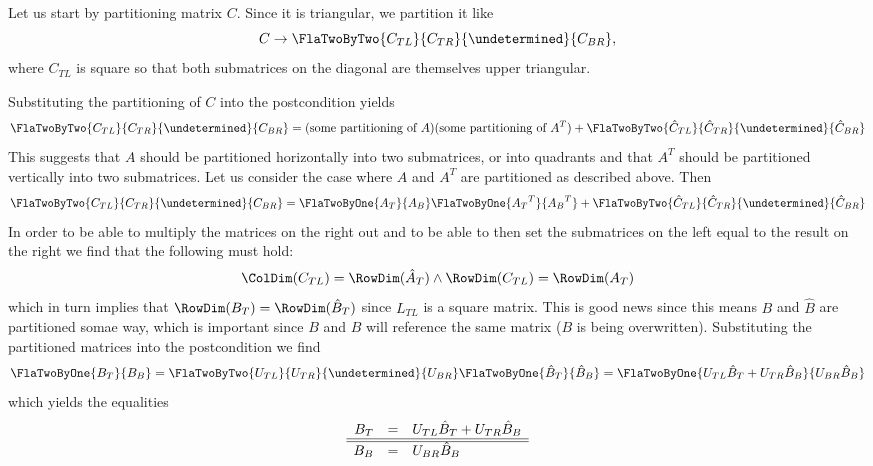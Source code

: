 Let us start by partitioning matrix $ C $.  Since it is triangular, we
partition it like
\[
C \rightarrow \FlaTwoByTwo{ C_{TL} }        { C_{TR} }
                          { \undetermined } { C_{BR} },
\]
where $ C_{TL} $ is square so that both submatrices on the diagonal
are themselves upper triangular.

Substituting the partitioning of $ C $ into the postcondition yields
\[
\FlaTwoByTwo{ C_{TL} }        { C_{TR} }
            { \undetermined } { C_{BR} }
= 
( \mbox{some partitioning of }{A} )
( \mbox{some partitioning of }{A^T} )
+
\FlaTwoByTwo{ \hat{C}_{TL} }  { \hat{C}_{TR} }
            { \undetermined } { \hat{C}_{BR} }
\]
This suggests that $ A $ should be partitioned
horizontally  into two submatrices, or into quadrants and that $ A^T $ should be partitioned vertically into two submatrices.  Let us consider
the case where $ A $ and $ A^T $ are partitioned as described above.  Then
\[
\FlaTwoByTwo{ C_{TL} }        { C_{TR} }
            { \undetermined } { C_{BR} }
= 
\FlaTwoByOne{ A_T }
            { A_B }

\FlaTwoByOne{ {A_T}^T }
            { {A_B}^T }
+
\FlaTwoByTwo{ \hat{C}_{TL} }   { \hat{C}_{TR} }
            { \undetermined }  { \hat{C}_{BR} }
\]
In order to be able to multiply the matrices on the right out and to
be able to then set the submatrices on the left equal to the result on
the right we find that the following must hold:
\[
\ColDim( C_{TL} ) = \RowDim( \hat{A}_T ) 
\wedge
\RowDim( C_{TL} ) = \RowDim( {A}_T ) 
\]
which in turn implies that $ \RowDim( B_T )= \RowDim( \hat{B}_T ) $
since $ L_{TL} $ is a square matrix.  This is good news since this
means $ B $ and $ \hat{B} $ are partitioned somae way, which is
important since $ B $ and $ \hat{B} $ will reference the same matrix ($
B $ is being overwritten).  Substituting the partitioned matrices into
the postcondition we find
\[
\FlaTwoByOne{ B_T }
            { B_B }
=
\FlaTwoByTwo{ U_{TL} }        { U_{TR} }
            { \undetermined } { U_{BR} }
\FlaTwoByOne{ \hat{B}_T }
            { \hat{B}_B }
=
\FlaTwoByOne{ U_{TL} \hat{B}_T + U_{TR} \hat{B}_B}
            { U_{BR} \hat{B}_B }
\]
which yields the equalities
\begin{equation}
\label{eqn:ltrmm_lln}
\begin{array}{r c l}
B_T &=& U_{TL} \hat{B}_T + U_{TR} \hat{B}_B \\ \hline \hline
B_B &=& U_{BR} \hat{B}_B
\end{array}
\end{equation}

